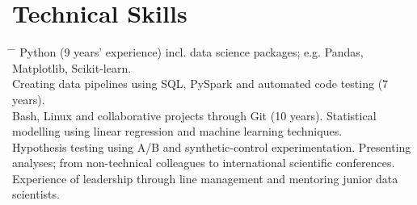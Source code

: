 \documentclass[10pt]{article} %
\begin{document}
\section{Technical Skills}
\begin{tabbing}
  \hspace{3mm} \= \hspace{30mm} \= \kill
        {
          Python (9 years' experience) incl. data science packages; e.g. Pandas, Matplotlib, Scikit-learn. \\
          \>\>Creating data pipelines using SQL, PySpark and automated code testing (7 years). \\
          \>\>Bash, Linux and collaborative projects through Git (10 years).
        }
        {
          Statistical modelling using linear regression and machine learning techniques. \\
          \>\>Hypothesis testing using A/B and synthetic-control experimentation.
        }
        {
          Presenting analyses; from non-technical colleagues to international scientific conferences. \\
          \>\>Experience of leadership through line management and mentoring junior data scientists.
        }
\end{tabbing}

\vspace{-9mm}
\end{document}

